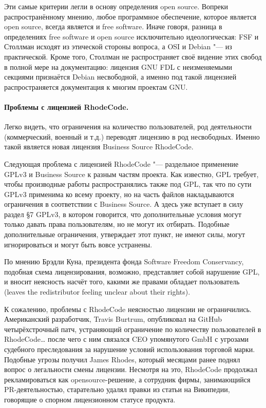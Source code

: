 \documentclass[10pt, a5paper]{article}
\begin{document}
Эти самые критерии легли в основу определения open source. Вопреки распространённому мнению, любое программное обеспечение, которое является open source, всегда является и free software. Иначе говоря, разница в определениях free software и open source исключительно идеологическая: FSF и Столлман исходят из этической стороны вопроса, а OSI и Debian "--- из практической. Кроме того, Столлман не распространяет своё видение этих свобод в полной мере на документацию: лицензия GNU FDL с неизменяемыми секциями признаётся Debian несвободной, а именно под такой лицензией распространяется документация к многим проектам GNU.

\paragraph{Проблемы с лицензией RhodeCode.}

Легко видеть, что ограничения на количество пользователей, род деятельности (коммерческий, военный и т.д.) переводят лицензию в род несвободных. Именно такой является новая лицензия Business Source RhodeCode.

Следующая проблема с лицензией RhodeCode "--- раздельное применение GPLv3 и Business Source к разным частям проекта. Как известно, GPL требует, чтобы производные работы распространялись также под GPL, так что по сути GPLv3 применима ко всему проекту, но на часть файлов накладываются ограничения в соответствии с Business Source. А здесь уже вступает в силу раздел §7 GPLv3, в котором говорится, что дополнительные условия могут только давать права пользователям, но не могут их отбирать. Подобные дополнительные ограничения, утверждает этот пункт, не имеют силы, могут игнорироваться и могут быть вовсе устранены.

По мнению Брэдли Куна, президента фонда Software Freedom Conservancy, подобная схема лицензирования, возможно, представляет собой нарушение GPL, и вносит неясность насчёт того, какими же правами обладает пользователь (leaves the redistributor feeling unclear about their rights).

К сожалению, проблемы с RhodeCode неясностью лицензии не ограничились. Американский разработчик, Travis Burtrum, опубликовал на GitHub четырёхстрочный патч, устраняющий ограничение по количеству пользователей в RhodeCode\ldots{} после чего с ним связался CEO упомянутого GmbH с угрозами судебного преследования за нарушение условий использования торговой марки. Подобные угрозы получил James Rhodes, который месяцами ранее поднял вопрос о легальности смены лицензии. Несмотря на это, RhodeCode продолжал рекламироваться как opensource-решение, а сотрудник фирмы, занимающийся PR-деятельностью, старательно удалял правки из статьи на Википедии, говорящие о спорном лицензионном статусе продукта.
\end{document}
